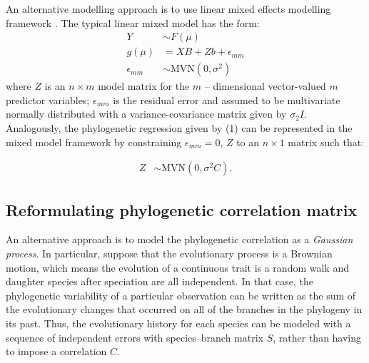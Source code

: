 An alternative modelling approach is to use linear mixed effects modelling framework \citep{lynch1991methods}.
The typical linear mixed model has the form:
\begin{align}
Y & \sim F(\mu) \label{eq:glmm1} \\
g(\mu) & = XB + Zb + \epsilon_{mm} \label{eq:glmm2} \\
\epsilon_{mm} & \sim \textrm{MVN}(0,\sigma^2) \label{eq:glmm3}
\end{align}
where $Z$ is an $n \times m$ model matrix for the $m$ -- dimensional vector-valued $m$ predictor variables; $\epsilon_{mm}$ is the residual error and assumed to be multivariate normally distributed with a variance-covariance matrix given by $\sigma_{2}I$.
Analogously, the phylogenetic regression given by (1) can be represented in the mixed model framework by constraining $\epsilon_{mm} = 0$, $Z$ to an $n \times 1$ matrix such that: 

\begin{align}
Z & \sim \textrm{MVN}(0,\sigma^{2}C). \label{eq:glmmgls}
\end{align}

\subsection{Reformulating phylogenetic correlation matrix}

An alternative approach is to model the phylogenetic correlation as a \textit{Gaussian process}. 
In particular, suppose that the evolutionary process is a Brownian motion, which means the evolution of a continuous trait is a random walk and daughter species after speciation are all independent.  
In that case, the phylogenetic variability of a particular observation can be written as the sum of the evolutionary changes that occurred on all of the branches in the phylogeny in its past. 
Thus, the evolutionary history for each species can be modeled with a sequence of independent errors with species--branch matrix $S$, rather than having to impose a correlation $C$. 

